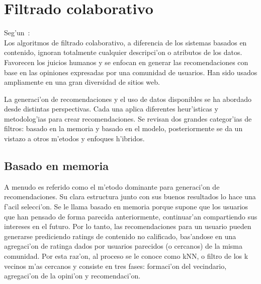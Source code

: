 \documentclass[11pt]{article}
\begin{document}
\section{Filtrado colaborativo}
Seg'un~\cite{recsys:nlathia}:\\
Los algoritmos de filtrado colaborativo, a diferencia de los sistemas basados en contenido, ignoran totalmente cualquier descripci'on o atributos de los datos. Favorecen los juicios humanos y se enfocan en generar las recomendaciones con base en las opiniones expresadas por una comunidad de usuarios. Han sido usados ampliamente en una gran diversidad de sitios web.

La generaci'on de recomendaciones y el uso de datos disponibles se ha abordado desde distintas perspectivas. Cada una aplica diferentes heur'isticas y metodolog'ias para crear recomendaciones. Se revisan dos grandes categor'ias de filtros: basado en la memoria y basado en el modelo, posteriormente se da un vistazo a otros m'etodos y enfoques h'ibridos.


\subsection{Basado en memoria}
A menudo es referido como el m'etodo dominante para generaci'on de recomendaciones. Su clara estructura junto con sus buenos resultados lo hace una f'acil selecci'on. Se le llama basado en memoria porque supone que los usuarios que han pensado de forma parecida anteriormente, continuar'an compartiendo sus intereses en el futuro. Por lo tanto, las recomendaciones para un usuario pueden generarse prediciendo ratings de contenido no calificado, bas'andose en una agregaci'on de ratinga dados por usuarios parecidos (o cercanos) de la misma comunidad. Por esta raz'on, al proceso se le conoce como kNN, o filtro de los k vecinos m'as cercanos y consiste en tres fases: formaci'on del vecindario, agregaci'on de la opini'on y recomendaci'on.
\end{document}
